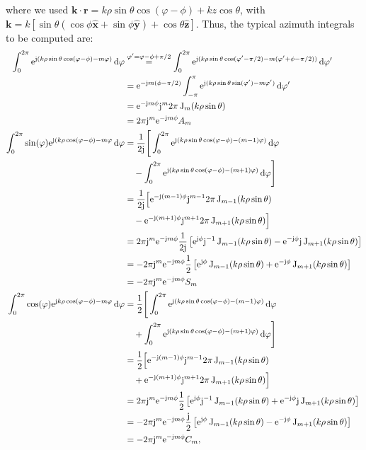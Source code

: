 \documentclass[a4paper,12pt]{article}
\renewcommand{\vec}[1]{\boldsymbol{#1}}
\newcommand{\unitvec}[1]{\hat{\vec{#1}}}
\newcommand{\mrm}[1]{\mathrm{#1}}
\newcommand{\diff}{\operatorname{d}\!}
\newcommand{\ju}{\mrm{j}}
\newcommand{\eu}{\mrm{e}}
\newcommand{\rv}{\vec{r}}
\newcommand{\kv}{\vec{k}}
\newcommand{\xuv}{\unitvec{x}}
\newcommand{\yuv}{\unitvec{y}}
\newcommand{\zuv}{\unitvec{z}}
\newcommand{\BesselJ}{\operatorname{J}}
\begin{document}
where we used
$\kv\cdot\rv = k\rho\sin\theta\cos(\varphi-\phi) + kz\cos\theta$, with
$\kv = k[\sin\theta(\cos\phi\xuv + \sin\phi\yuv) + \cos\theta\zuv]$.
Thus, the typical azimuth integrals to be computed are:
\begin{align}
  \int_{0}^{2\pi} \eu^{\ju(k\rho\sin\theta\cos(\varphi-\phi) - m\varphi)} \diff\varphi
  &\stackrel{\varphi'=\varphi-\phi+\pi/2}{=} \int_{0}^{2\pi} \eu^{\ju(k\rho\sin\theta\cos(\varphi'-\pi/2) - m(\varphi'+\phi-\pi/2))} \diff\varphi' \notag \\
  &= \eu^{-\ju m(\phi-\pi/2)} \int_{-\pi}^{\pi} \eu^{\ju(k\rho\sin\theta\sin(\varphi') - m\varphi')} \diff\varphi' \notag \\
  &= \eu^{-\ju m\phi} \ju^{m}2\pi\BesselJ_{m}(k\rho\sin\theta) \notag \\
  &= 2\pi\ju^{m}\eu^{-\ju m\phi}A_{m} \\
  \int_{0}^{2\pi} \sin(\varphi)\eu^{\ju(k\rho\cos(\varphi-\phi) - m\varphi} \diff\varphi &= \frac{1}{2\ju} \Bigg[ \int_{0}^{2\pi} \eu^{\ju(k\rho\sin\theta\cos(\varphi-\phi) - (m-1)\varphi)} \diff\varphi \notag \\
  &\quad - \int_{0}^{2\pi} \eu^{\ju(k\rho\sin\theta\cos(\varphi-\phi) - (m+1)\varphi)} \diff\varphi \Bigg] \notag \\
  &= \frac{1}{2\ju} \Big[ \eu^{-\ju(m-1)\phi}\ju^{m-1}2\pi\BesselJ_{m-1}(k\rho\sin\theta) \notag \\
  &\quad - \eu^{-\ju(m+1)\phi}\ju^{m+1}2\pi\BesselJ_{m+1}(k\rho\sin\theta) \Big] \notag \\
  &= 2\pi\ju^{m}\eu^{-\ju m\phi} \frac{1}{2\ju}\left[ \eu^{\ju\phi}\ju^{-1}\BesselJ_{m-1}(k\rho\sin\theta) - \eu^{-\ju\phi}\ju\BesselJ_{m+1}(k\rho\sin\theta) \right] \notag \\
  &= -2\pi\ju^{m}\eu^{-\ju m\phi} \frac{1}{2}\left[ \eu^{\ju\phi}\BesselJ_{m-1}(k\rho\sin\theta) + \eu^{-\ju\phi}\BesselJ_{m+1}(k\rho\sin\theta) \right] \notag \\
  &= -2\pi\ju^{m}\eu^{-\ju m\phi}S_{m} \\
  \int_{0}^{2\pi} \cos(\varphi)\eu^{\ju k\rho\cos(\varphi-\phi) - m\varphi} \diff\varphi &= \frac{1}{2} \Bigg[ \int_{0}^{2\pi} \eu^{\ju(k\rho\sin\theta\cos(\varphi-\phi) - (m-1)\varphi)} \diff\varphi \notag \\
  &\quad + \int_{0}^{2\pi} \eu^{\ju(k\rho\sin\theta\cos(\varphi-\phi) - (m+1)\varphi)} \diff\varphi \Bigg] \notag \\
  &= \frac{1}{2} \Big[ \eu^{-\ju(m-1)\phi}\ju^{m-1}2\pi\BesselJ_{m-1}(k\rho\sin\theta) \notag \\
  &\quad + \eu^{-\ju(m+1)\phi}\ju^{m+1}2\pi\BesselJ_{m+1}(k\rho\sin\theta) \Big] \notag \\
  &= 2\pi\ju^{m}\eu^{-\ju m\phi} \frac{1}{2} \left[ \eu^{\ju\phi}\ju^{-1}\BesselJ_{m-1}(k\rho\sin\theta) + \eu^{-\ju\phi}\ju\BesselJ_{m+1}(k\rho\sin\theta) \right] \notag \\
  &= -2\pi\ju^{m}\eu^{-\ju m\phi} \frac{\ju}{2} \left[ \eu^{\ju\phi}\BesselJ_{m-1}(k\rho\sin\theta) - \eu^{-\ju\phi}\BesselJ_{m+1}(k\rho\sin\theta) \right] \notag \\
  &= -2\pi\ju^{m}\eu^{-\ju m\phi}C_{m},
\end{align}
\end{document}
